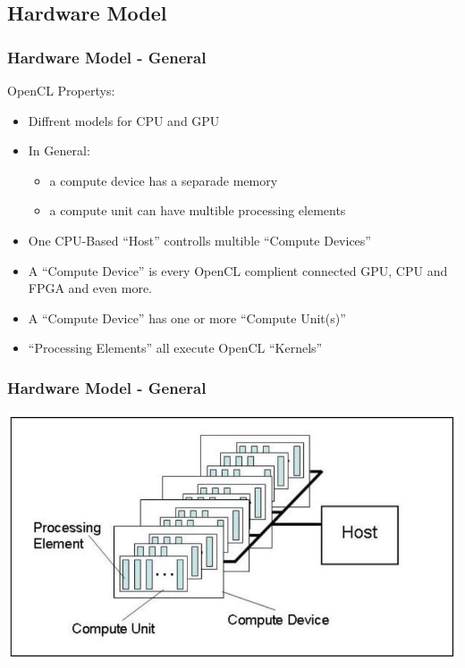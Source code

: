 \documentclass{beamer}
\begin{document}
\subsection{Hardware Model}
\begin{frame}
    \frametitle{Hardware Model - General}
    OpenCL Propertys:
    \begin{itemize}
     \item Diffrent models for CPU and GPU
     \item In General:
     \begin{itemize}
      \item a compute device has a separade memory
      \item a compute unit can have multible processing elements 
     \end{itemize}
     \item One CPU-Based ``Host'' controlls multible ``Compute Devices''
     \item A ``Compute Device'' is every OpenCL complient connected GPU, CPU and FPGA and even more.
     \item A ``Compute Device'' has one or more ``Compute Unit(s)''
     \item ``Processing Elements'' all execute OpenCL ``Kernels''
    \end{itemize}
\end{frame}
\begin{frame}
    \frametitle{Hardware Model - General}
    \includegraphics[width=\textwidth]{res/KhronosPlatformModel.png}
\end{frame}
\end{document}
